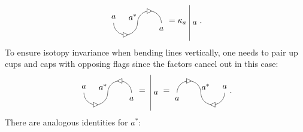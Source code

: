 	\begin{equation}
		\begin{tikzpicture}[baseline=(current bounding box.center)]
			\draw (0,0) arc (180:0:0.5);
			\draw[fill=white] (0.6,0.5) -- (0.4,0.6) -- (0.4,0.4) -- cycle;
			\draw (0,0) arc (0:-180:0.5);
			\draw[fill=white] (-0.4,-0.5) -- (-0.6,-0.6) -- (-0.6,-0.4) -- cycle;
			\node at (-0.2,0.25) {$a^*$};
			\node at (1,-0.25) {$a$};
			\node at (-1,0.25) {$a$};
		\end{tikzpicture}=\kappa_a\ 
		\begin{tikzpicture}[baseline=(current bounding box.center)]
			\draw (0,-0.75) to node[right] {$a$} (0,0.75);
		\end{tikzpicture}.
	\end{equation}
To ensure isotopy invariance when bending lines vertically, one needs to pair up cups and caps with opposing flags since the factors cancel out in this case:
	\begin{equation}
		\begin{tikzpicture}[baseline=(current bounding box.center)]
			\draw (0,0) arc (180:0:0.5);
			\draw[fill=white] (0.4,0.5) -- (0.6,0.4) -- (0.6,0.6) -- cycle;
			\draw (0,0) arc (0:-180:0.5);
			\draw[fill=white] (-0.4,-0.5) -- (-0.6,-0.6) -- (-0.6,-0.4) -- cycle;
			\node at (-0.2,0.25) {$a^*$};
			\node at (1,-0.25) {$a$};
			\node at (-1,0.25) {$a$};
		\end{tikzpicture}=\ 
		\begin{tikzpicture}[baseline=(current bounding box.center)]
			\draw (0,-0.75) to node[right] {$a$} (0,0.75);
		\end{tikzpicture}=
		\begin{tikzpicture}[baseline=(current bounding box.center),yscale=-1]
			\draw (0,0) arc (180:0:0.5);
			\draw[fill=white] (0.4,0.5) -- (0.6,0.4) -- (0.6,0.6) -- cycle;
			\draw (0,0) arc (0:-180:0.5);
			\draw[fill=white] (-0.4,-0.5) -- (-0.6,-0.6) -- (-0.6,-0.4) -- cycle;
			\node at (0.2,-0.25) {$a^*$};
			\node at (1,-0.25) {$a$};
			\node at (-1,0.25) {$a$};
		\end{tikzpicture}.
	\end{equation}
There are analogous identities for $a^*$:
